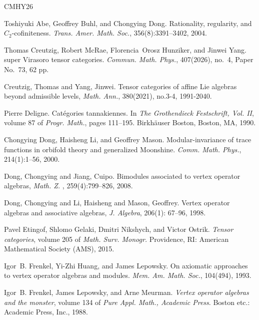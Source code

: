 \documentclass[12pt, english]{article}
\numberwithin{equation}{section}
\theoremstyle{plain}
\theoremstyle{definition}
\theoremstyle{remark}
\begin{document}
	\begin{thebibliography}{CMHY26}
		
		Toshiyuki Abe, Geoffrey Buhl, and Chongying Dong.
		\newblock Rationality, regularity, and {$C_2$}-cofiniteness.
		\newblock \emph{Trans. Amer. Math. Soc.}, 356(8):3391--3402, 2004.
		
		Thomas Creutzig, Robert McRae, Florencia~Orosz Hunziker, and Jinwei Yang.
		 super {Virasoro} tensor categories.
		\newblock \emph{Commun. Math. Phys.}, 407(2026), no.~4, Paper No.~73, 62 pp.
		
		Creutzig, Thomas and Yang, Jinwei.
		\newblock Tensor categories of affine {L}ie algebras beyond admissible levels,
		\newblock \emph{Math. Ann.}, 380(2021), no.3-4, 1991-2040.
		
		Pierre Deligne.
		\newblock Cat\'egories tannakiennes.
		\newblock In \emph{The Grothendieck Festschrift, Vol. II}, volume 87 of \emph{Progr. Math.}, pages 111--195. Birkh\"auser Boston, Boston, MA, 1990.
		
		Chongying Dong, Haisheng Li, and Geoffrey Mason.
		\newblock Modular-invariance of trace functions in orbifold theory and generalized {M}oonshine.
		\newblock \emph{Comm. Math. Phys.}, 214(1):1--56, 2000.
		
		Dong, Chongying and Jiang, Cuipo.
		\newblock  Bimodules associated to vertex operator algebras,
		\newblock \emph{Math. Z. }, 259(4):799--826, 2008.
		
		Dong, Chongying and Li, Haisheng and Mason, Geoffrey.
		\newblock Vertex operator algebras and associative algebras,
		\newblock \emph{J. Algebra}, 206(1): 67--96, 1998.
		
		Pavel Etingof, Shlomo Gelaki, Dmitri Nikshych, and Victor Ostrik.
		\newblock \emph{Tensor categories}, volume 205 of \emph{Math. Surv. Monogr.}
		\newblock Providence, RI: American Mathematical Society (AMS), 2015.
		
		Igor~B. Frenkel, Yi-Zhi Huang, and James Lepowsky.
		\newblock On axiomatic approaches to vertex operator algebras and modules.
		\newblock \emph{Mem. Am. Math. Soc.}, 104(494), 1993.
		
		Igor~B. Frenkel, James Lepowsky, and Arne Meurman.
		\newblock \emph{Vertex operator algebras and the monster}, volume 134 of \emph{Pure Appl. Math., Academic Press}.
		\newblock Boston etc.: Academic Press, Inc., 1988.
		

\end{thebibliography}
\end{document}
